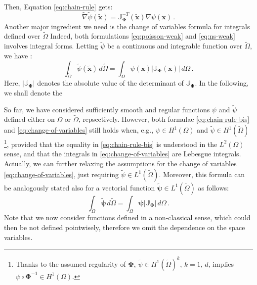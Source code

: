 \documentclass[12pt, a4paper, twoside, openright]{report}
\numberwithin{equation}{chapter}
\theoremstyle{theorem}
\theoremstyle{definition}
\theoremstyle{remark}
\theoremstyle{proposition}
\numberwithin{figure}{chapter}
\newcommand{\wt}[1]{\widetilde{#1}}
\newcommand{\bg}[1]{\boldsymbol{#1}}
\begin{document}
		Then, Equation \eqref{eq:chain-rule} gets:
		\begin{equation}
			\label{eq:chain-rule-bis}
			\wt{\nabla}{\wt{\psi}}(\wt{\bg{x}}) = \mathbb{J}_{\bg{\Phi}}^{-T} (\wt{\bg{x}}) \nabla{\psi}(\bg{x}) \, .
		\end{equation}  
		Another major ingredient we need is the change of variables formula for integrals defined over $\wt{\Omega}$ Indeed, both formulations \eqref{eq:poisson-weak} and \eqref{eq:ns-weak} involves integral forms. Letting $\wt{\psi}$ be a continuous and integrable function over $\wt{\Omega}$, we have \cite{Rud64}:
		\begin{equation}
			\label{eq:change-of-variables}
			\int_{\wt{\Omega}} \wt{\psi}(\wt{\bg{x}}) \, d \wt{\Omega} = \int_{\Omega} \psi(\bg{x}) \lvert \mathbb{J}_{\bg{\Phi}}(\bg{x}) \rvert \, d \Omega \, .
		\end{equation}
		Here, $\lvert \mathbb{J}_{\bg{\Phi}} \rvert$ denotes the absolute value of the determinant of $\mathbb{J}_{\bg{\Phi}}$. In the following, we shall denote the 
		
		So far, we have considered sufficiently smooth and regular functions $\psi$ and $\wt{\psi}$ defined either on $\Omega$ or $\wt{\Omega}$, repsectively. However, both formulae \eqref{eq:chain-rule-bis} and \eqref{eq:change-of-variables} still holds when, e.g., $\psi \in H^1(\Omega)$ and $\wt{\psi} \in H^1(\wt{\Omega})$\footnote{Thanks to the assumed regularity of $\bg{\Phi}$, $\wt{\psi} \in H^1(\wt{\Omega})^k$, $k = 1, \, d$, implies $\psi \circ \bg{\Phi}^{-1} \in H^1(\Omega)$.}, provided that the equality in \eqref{eq:chain-rule-bis} is understood in the $L^2(\Omega)$ sense, and that the integrals in \eqref{eq:change-of-variables} are Lebesgue integrals. Actually, we can further relaxing the assumptions for the change of variables \eqref{eq:change-of-variables}, just requiring $\wt{\psi} \in L^1(\wt{\Omega})$. Moreover, this formula can be analogously stated also for a vectorial function $\wt{\bg{\psi}} \in L^1(\wt{\Omega})$ as follows:
		\begin{equation}
			\label{eq:change-of-variables-vectorial}
			\int_{\wt{\Omega}} \wt{\bg{\psi}} \, d \wt{\Omega} = \int_{\Omega} \bg{\psi} \lvert \mathbb{J}_{\bg{\Phi}} \rvert \, d \Omega \, .
		\end{equation}
		Note that we now consider functions defined in a non-classical sense, which could then be not defined pointwisely, therefore we omit the dependence on the space variables.
		
\end{document}
